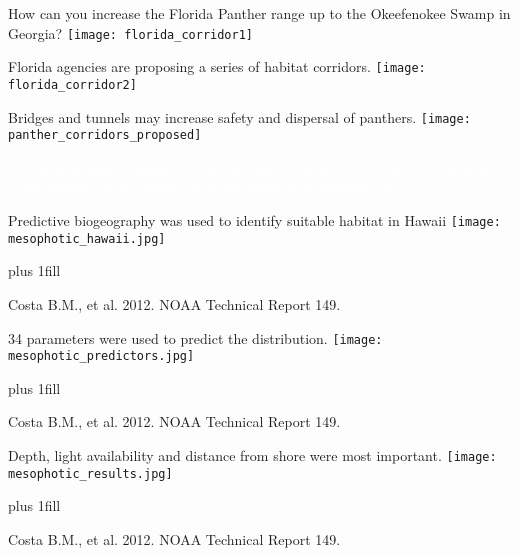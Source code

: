 \documentclass[t]{beamer}
\begin{document}
{
\begin{frame}[plain]
\end{frame}
}

\begin{frame}[plain]{How can you increase the Florida Panther range up to the Okeefenokee Swamp in Georgia?}
	\centering%
		\texttt{[image: florida\_corridor1]}
\end{frame}

\begin{frame}[plain]{Florida agencies are proposing a series of habitat corridors.}
	\centering%
		\texttt{[image: florida\_corridor2]}
\end{frame}


\begin{frame}[plain]{Bridges and tunnels may increase safety and dispersal of panthers.}
	\centering%
		\texttt{[image: panther\_corridors\_proposed]}
\end{frame}

{
\begin{frame}[b,plain]{\textcolor{white}{Use biogeographic techniques to predict distribution and identify suitable habitat of mesophotic corals.}}
\hfill \textcolor{white}{\textit{Leptoseris} is one genus of mesophotic coral.}
\end{frame}
}

\begin{frame}[t,plain]{Predictive biogeography was used to identify suitable habitat in Hawaii}
	\centering%
		\texttt{[image: mesophotic\_hawaii.jpg]}\par
		
	\vskip0pt plus 1fill
		
\hfill\tiny Costa B.M., et al. 2012. NOAA Technical Report 149.
\end{frame}

\begin{frame}[t,plain]{34 parameters were used to predict the distribution.}
	\centering%
		\texttt{[image: mesophotic\_predictors.jpg]}\par

	\vskip0pt plus 1fill

\hfill\tiny Costa B.M., et al. 2012. NOAA Technical Report 149.
\end{frame}

\begin{frame}[t,plain]{Depth, light availability and distance from shore were most important.}
	\centering%
		\texttt{[image: mesophotic\_results.jpg]}\par

	\vskip0pt plus 1fill

\hfill\tiny Costa B.M., et al. 2012. NOAA Technical Report 149.
\end{frame}
\end{document}

